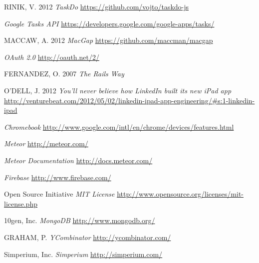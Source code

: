 \begin{thebibliography}{999}
RINIK, V. 2012 \emph{TaskDo}
\url{https://github.com/vojto/taskdo-js}

\emph{Google Tasks API}
\url{https://developers.google.com/google-apps/tasks/}

MACCAW, A. 2012 \emph{MacGap}
\url{https://github.com/maccman/macgap}

 \emph{OAuth 2.0}
\url{http://oauth.net/2/}

FERNANDEZ, O. 2007 \emph{The Rails Way}

O'DELL, J. 2012 \emph{You’ll never believe how LinkedIn built its new iPad app}
\url{http://venturebeat.com/2012/05/02/linkedin-ipad-app-engineering/#s:1-linkedin-ipad}

\emph{Chromebook}
\url{http://www.google.com/intl/en/chrome/devices/features.html}

\emph{Meteor}
\url{http://meteor.com/}

\emph{Meteor Documentation}
\url{http://docs.meteor.com/}

\emph{Firebase}
\url{http://www.firebase.com/}

Open Source Initiative \emph{MIT License}
\url{http://www.opensource.org/licenses/mit-license.php}

10gen, Inc. \emph{MongoDB}
\url{http://www.mongodb.org/}

GRAHAM, P. \emph{YCombinator}
\url{http://ycombinator.com/}

Simperium, Inc. \emph{Simperium}
\url{http://simperium.com/}


\end{thebibliography}
